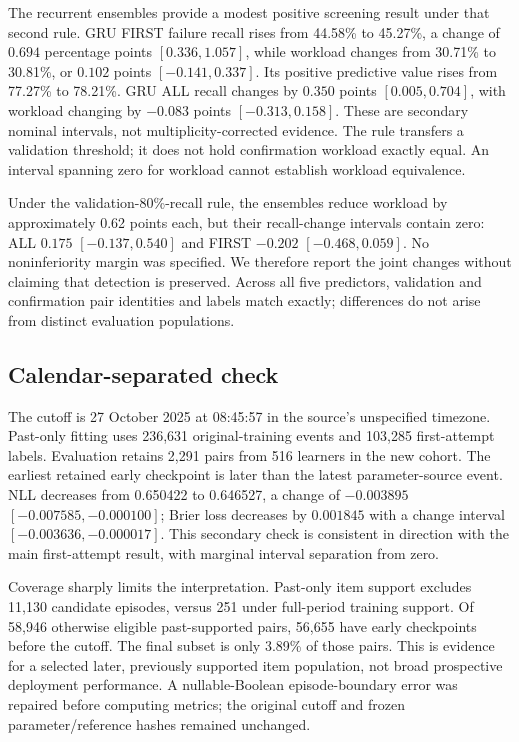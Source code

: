 \documentclass[11pt]{article}
\newcommand{\1}{\mathbb{I}}
\begin{document}
The recurrent ensembles provide a modest positive screening result under that second rule. GRU FIRST failure recall rises from 44.58\% to 45.27\%, a change of $0.694$ percentage points $[0.336,1.057]$, while workload changes from 30.71\% to 30.81\%, or $0.102$ points $[-0.141,0.337]$. Its positive predictive value rises from 77.27\% to 78.21\%. GRU ALL recall changes by $0.350$ points $[0.005,0.704]$, with workload changing by $-0.083$ points $[-0.313,0.158]$. These are secondary nominal intervals, not multiplicity-corrected evidence. The rule transfers a validation threshold; it does not hold confirmation workload exactly equal. An interval spanning zero for workload cannot establish workload equivalence.

Under the validation-80\%-recall rule, the ensembles reduce workload by approximately 0.62 points each, but their recall-change intervals contain zero: ALL $0.175$ $[-0.137,0.540]$ and FIRST $-0.202$ $[-0.468,0.059]$. No noninferiority margin was specified. We therefore report the joint changes without claiming that detection is preserved. Across all five predictors, validation and confirmation pair identities and labels match exactly; differences do not arise from distinct evaluation populations.

\subsection{Calendar-separated check}
The cutoff is 27 October 2025 at 08:45:57 in the source's unspecified timezone. Past-only fitting uses 236,631 original-training events and 103,285 first-attempt labels. Evaluation retains 2,291 pairs from 516 learners in the new cohort. The earliest retained early checkpoint is later than the latest parameter-source event. NLL decreases from 0.650422 to 0.646527, a change of $-0.003895$ $[-0.007585,-0.000100]$; Brier loss decreases by $0.001845$ with a change interval $[-0.003636,-0.000017]$. This secondary check is consistent in direction with the main first-attempt result, with marginal interval separation from zero.

Coverage sharply limits the interpretation. Past-only item support excludes 11,130 candidate episodes, versus 251 under full-period training support. Of 58,946 otherwise eligible past-supported pairs, 56,655 have early checkpoints before the cutoff. The final subset is only 3.89\% of those pairs. This is evidence for a selected later, previously supported item population, not broad prospective deployment performance. A nullable-Boolean episode-boundary error was repaired before computing metrics; the original cutoff and frozen parameter/reference hashes remained unchanged.
\end{document}
